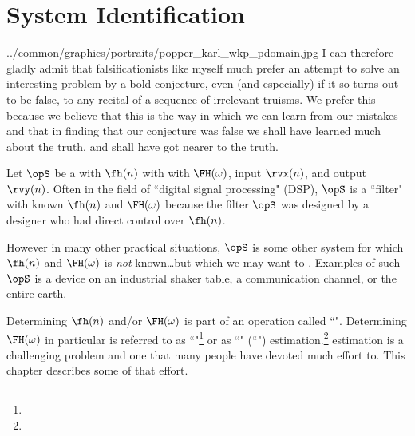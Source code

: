 \chapter{System Identification}
  {../common/graphics/portraits/popper_karl_wkp_pdomain.jpg}
  {%
  I can therefore gladly admit that falsificationists like myself much
  prefer an attempt to solve an interesting problem by a bold conjecture,
  even (and especially) if it so turns out to be false,
  to any recital of a sequence of irrelevant truisms.
  We prefer this because we believe that this is the way in which we can
  learn from our mistakes and that in finding that our conjecture was false
  we shall have learned much about the truth,
  and shall have got nearer to the truth.
  }

Let $\opS$ be a  with  $\fh(n)$ with
with  $\FH(\omega)$,
input $\rvx(n)$, and output $\rvy(n)$.
Often in the field of ``digital signal processing" (DSP), $\opS$ is a ``filter"
with known $\fh(n)$ and $\FH(\omega)$ because the filter $\opS$ was
designed by a designer who had direct control over $\fh(n)$.

However in many other practical situations, $\opS$ is some other system
for which $\fh(n)$ and $\FH(\omega)$ is \emph{not} known\ldots but which we may
want to . Examples of such $\opS$ is a
device on an industrial shaker table, a communication channel, or the entire earth.

Determining $\fh(n)$ and/or $\FH(\omega)$ is part of an operation called ``".
Determining $\FH(\omega)$ in particular is referred to as
``"\footnote{}
or as
``" (``") estimation.\footnote{}
 estimation is a challenging problem and one that
many people have devoted much effort to.
This chapter describes some of that effort.

